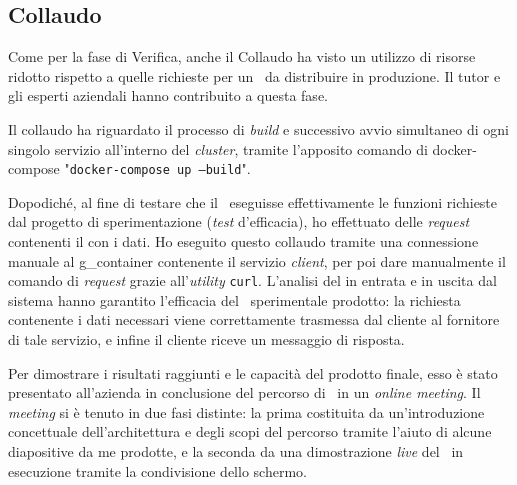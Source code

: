 \subsection{Collaudo}

Come per la fase di Verifica, anche il Collaudo ha visto un utilizzo di risorse ridotto rispetto a quelle richieste per un \software\ da distribuire in produzione.
Il tutor e gli esperti aziendali hanno contribuito a questa fase.

Il collaudo ha riguardato il processo di \textit{build} e successivo avvio simultaneo di ogni singolo servizio all'interno del \textit{cluster}, tramite l'apposito comando di docker-compose "\texttt{docker-compose up --build}".

Dopodiché, al fine di testare che il \software\ eseguisse effettivamente le funzioni richieste dal progetto di sperimentazione (\textit{test} d'efficacia), ho effettuato delle   \textit{request} contenenti il  con i dati.
Ho eseguito questo collaudo tramite una connessione manuale al \gls{g_container} contenente il servizio  \textit{client}, per poi dare manualmente il comando di \textit{request} grazie all'\textit{utility} \texttt{curl}.
L'analisi del  in entrata e in uscita dal sistema hanno garantito l'efficacia del \software\ sperimentale prodotto: la richiesta contenente i dati necessari viene correttamente trasmessa dal cliente al fornitore di tale servizio, e infine il cliente riceve un messaggio di risposta.

Per dimostrare i risultati raggiunti e le capacità del prodotto finale, esso è stato presentato all'azienda in conclusione del percorso di \stage\ in un \textit{online meeting}.
Il \textit{meeting} si è tenuto in due fasi distinte: la prima costituita da un'introduzione concettuale dell'architettura e degli scopi del percorso tramite l'aiuto di alcune diapositive da me prodotte, e la seconda da una dimostrazione \textit{live} del \software\ in esecuzione tramite la condivisione dello schermo.

